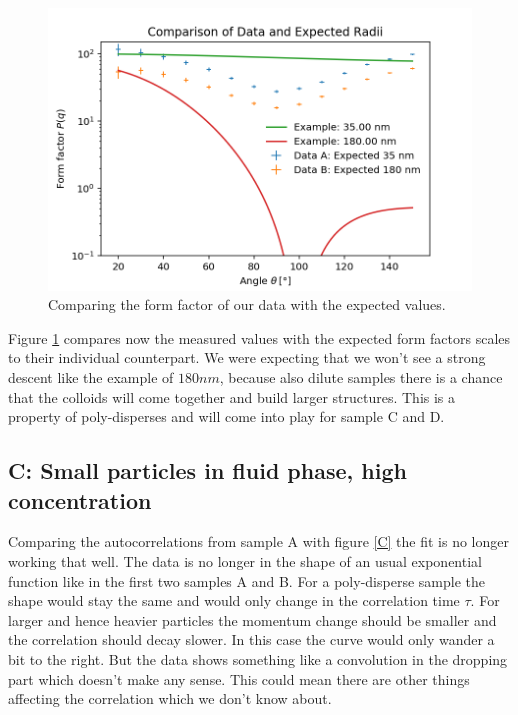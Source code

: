 \documentclass[]{article}
\begin{document}
\begin{figure}[!htbp]
\centering
\includegraphics[width=0.8\linewidth]{Plots/Comparison.png}
\caption{Comparing the form factor of our data with the expected values.}
\label{AB comparison}
\end{figure}

Figure \ref{AB comparison} compares now the measured values with the expected form factors scales to their individual counterpart.
We were expecting that we won't see a strong descent like the example of $180nm$, because also dilute samples there is a chance that the colloids will come together and build larger structures. This is a property of poly-disperses and will come into play for sample C and D. 

\subsection{C: Small particles in fluid phase, high concentration}
Comparing the autocorrelations from sample A with figure \ref{C} the fit is no longer working that well. The data is no longer in the shape of an usual exponential function like in the first two samples A and B. For a poly-disperse sample the shape would stay the same and would only change in the correlation time $\tau$. For larger and hence heavier particles the momentum change should be smaller and the correlation should decay slower. In this case the curve would only wander a bit to the right. But the data shows something like a convolution in the dropping part which doesn't make any sense. This could mean there are other things affecting the correlation which we don't know about.
\end{document}
